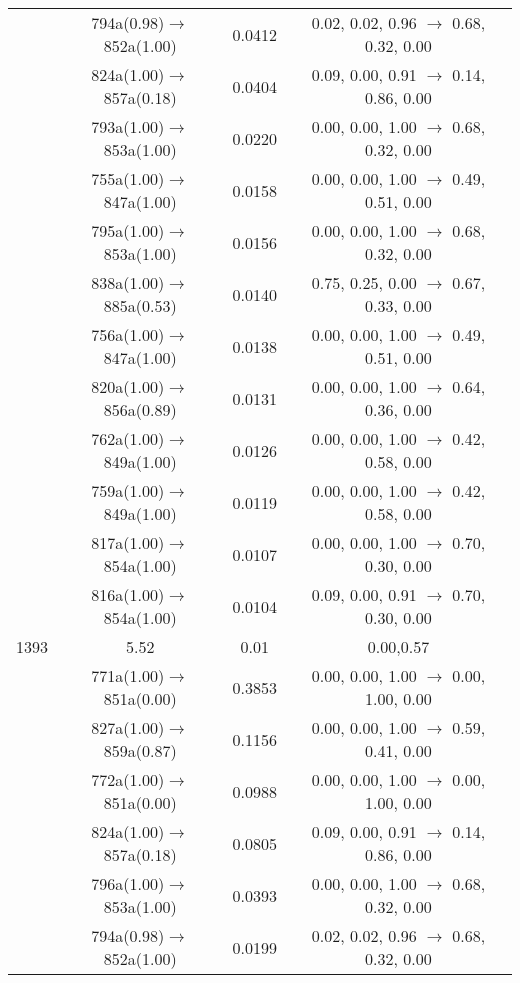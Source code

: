 \documentclass[10pt,a4paper]{article}
\begin{document}
\begin{longtable}{c|c|c|c}
 	& 794a(0.98)$\rightarrow$852a(1.00) &	 0.0412 &	 0.02, 0.02, 0.96 $\rightarrow$ 0.68, 0.32, 0.00 \\ 
 	& 824a(1.00)$\rightarrow$857a(0.18) &	 0.0404 &	 0.09, 0.00, 0.91 $\rightarrow$ 0.14, 0.86, 0.00 \\ 
 	& 793a(1.00)$\rightarrow$853a(1.00) &	 0.0220 &	 0.00, 0.00, 1.00 $\rightarrow$ 0.68, 0.32, 0.00 \\ 
 	& 755a(1.00)$\rightarrow$847a(1.00) &	 0.0158 &	 0.00, 0.00, 1.00 $\rightarrow$ 0.49, 0.51, 0.00 \\ 
 	& 795a(1.00)$\rightarrow$853a(1.00) &	 0.0156 &	 0.00, 0.00, 1.00 $\rightarrow$ 0.68, 0.32, 0.00 \\ 
 	& 838a(1.00)$\rightarrow$885a(0.53) &	 0.0140 &	 0.75, 0.25, 0.00 $\rightarrow$ 0.67, 0.33, 0.00 \\ 
 	& 756a(1.00)$\rightarrow$847a(1.00) &	 0.0138 &	 0.00, 0.00, 1.00 $\rightarrow$ 0.49, 0.51, 0.00 \\ 
 	& 820a(1.00)$\rightarrow$856a(0.89) &	 0.0131 &	 0.00, 0.00, 1.00 $\rightarrow$ 0.64, 0.36, 0.00 \\ 
 	& 762a(1.00)$\rightarrow$849a(1.00) &	 0.0126 &	 0.00, 0.00, 1.00 $\rightarrow$ 0.42, 0.58, 0.00 \\ 
 	& 759a(1.00)$\rightarrow$849a(1.00) &	 0.0119 &	 0.00, 0.00, 1.00 $\rightarrow$ 0.42, 0.58, 0.00 \\ 
 	& 817a(1.00)$\rightarrow$854a(1.00) &	 0.0107 &	 0.00, 0.00, 1.00 $\rightarrow$ 0.70, 0.30, 0.00 \\ 
 	& 816a(1.00)$\rightarrow$854a(1.00) &	 0.0104 &	 0.09, 0.00, 0.91 $\rightarrow$ 0.70, 0.30, 0.00 \\ 
 \hline1393 &	 5.52 &	 0.01 &	 0.00,0.57 \\ 
  	& 771a(1.00)$\rightarrow$851a(0.00) &	 0.3853 &	 0.00, 0.00, 1.00 $\rightarrow$ 0.00, 1.00, 0.00 \\ 
 	& 827a(1.00)$\rightarrow$859a(0.87) &	 0.1156 &	 0.00, 0.00, 1.00 $\rightarrow$ 0.59, 0.41, 0.00 \\ 
 	& 772a(1.00)$\rightarrow$851a(0.00) &	 0.0988 &	 0.00, 0.00, 1.00 $\rightarrow$ 0.00, 1.00, 0.00 \\ 
 	& 824a(1.00)$\rightarrow$857a(0.18) &	 0.0805 &	 0.09, 0.00, 0.91 $\rightarrow$ 0.14, 0.86, 0.00 \\ 
 	& 796a(1.00)$\rightarrow$853a(1.00) &	 0.0393 &	 0.00, 0.00, 1.00 $\rightarrow$ 0.68, 0.32, 0.00 \\ 
 	& 794a(0.98)$\rightarrow$852a(1.00) &	 0.0199 &	 0.02, 0.02, 0.96 $\rightarrow$ 0.68, 0.32, 0.00 \\ 

\end{longtable}
\end{document}
